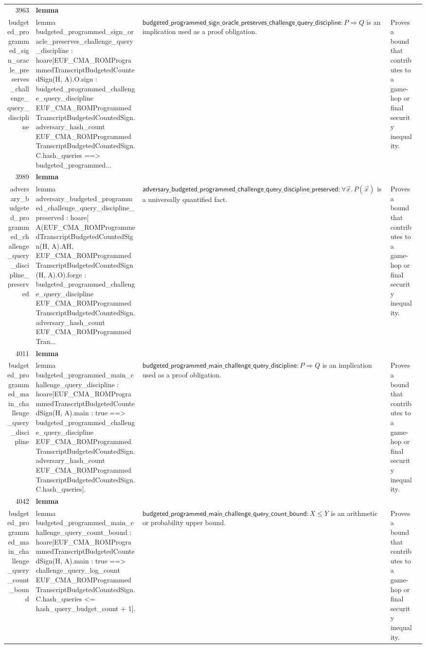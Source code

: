 \documentclass[10pt]{article}
\newcommand{\ec}[1]{\begingroup\ttfamily\scriptsize #1\endgroup}
\begin{document}
\begin{longtable}{r L{0.17\textwidth} L{0.26\textwidth} L{0.27\textwidth} L{0.20\textwidth}}
3963 & \textbf{lemma}\\\ec{budgeted\_programmed\_sign\_oracle\_preserves\_challenge\_query\_discipline} & \ec{lemma budgeted\_programmed\_sign\_oracle\_preserves\_challenge\_query\_discipline : hoare[EUF\_CMA\_ROMProgrammedTranscriptBudgetedCountedSign(H, A).O.sign : budgeted\_programmed\_challenge\_query\_discipline EUF\_CMA\_ROMProgrammedTranscriptBudgetedCountedSign.adversary\_hash\_count EUF\_CMA\_ROMProgrammedTranscriptBudgetedCountedSign.C.hash\_queries ==> budgeted\_programmed...} & \(\mathsf{budgeted\_programmed\_sign\_oracle\_preserves\_challenge\_query\_discipline} : P \Rightarrow Q\) is an implication used as a proof obligation. & Proves a bound that contributes to a game-hop or final security inequality. \\
3989 & \textbf{lemma}\\\ec{adversary\_budgeted\_programmed\_challenge\_query\_discipline\_preserved} & \ec{lemma adversary\_budgeted\_programmed\_challenge\_query\_discipline\_preserved : hoare[ A(EUF\_CMA\_ROMProgrammedTranscriptBudgetedCountedSign(H, A).AH, EUF\_CMA\_ROMProgrammedTranscriptBudgetedCountedSign(H, A).O).forge : budgeted\_programmed\_challenge\_query\_discipline EUF\_CMA\_ROMProgrammedTranscriptBudgetedCountedSign.adversary\_hash\_count EUF\_CMA\_ROMProgrammedTran...} & \(\mathsf{adversary\_budgeted\_programmed\_challenge\_query\_discipline\_preserved} : \forall \vec{x}.\, P(\vec{x})\) is a universally quantified fact. & Proves a bound that contributes to a game-hop or final security inequality. \\
4011 & \textbf{lemma}\\\ec{budgeted\_programmed\_main\_challenge\_query\_discipline} & \ec{lemma budgeted\_programmed\_main\_challenge\_query\_discipline : hoare[EUF\_CMA\_ROMProgrammedTranscriptBudgetedCountedSign(H, A).main : true ==> budgeted\_programmed\_challenge\_query\_discipline EUF\_CMA\_ROMProgrammedTranscriptBudgetedCountedSign.adversary\_hash\_count EUF\_CMA\_ROMProgrammedTranscriptBudgetedCountedSign.C.hash\_queries].} & \(\mathsf{budgeted\_programmed\_main\_challenge\_query\_discipline} : P \Rightarrow Q\) is an implication used as a proof obligation. & Proves a bound that contributes to a game-hop or final security inequality. \\
4042 & \textbf{lemma}\\\ec{budgeted\_programmed\_main\_challenge\_query\_count\_bound} & \ec{lemma budgeted\_programmed\_main\_challenge\_query\_count\_bound : hoare[EUF\_CMA\_ROMProgrammedTranscriptBudgetedCountedSign(H, A).main : true ==> challenge\_query\_log\_count EUF\_CMA\_ROMProgrammedTranscriptBudgetedCountedSign.C.hash\_queries <= hash\_query\_budget\_count + 1].} & \(\mathsf{budgeted\_programmed\_main\_challenge\_query\_count\_bound} : X \le Y\) is an arithmetic or probability upper bound. & Proves a bound that contributes to a game-hop or final security inequality. \\

\end{longtable}
\end{document}
